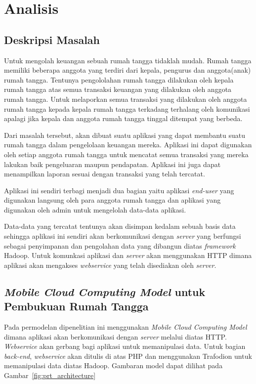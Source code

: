 \chapter{Analisis}
\label{chap:analisis}

\section{Deskripsi Masalah}
\label{sec:deskripsimasalah}

\hspace{0,5cm}Untuk mengolah keuangan sebuah rumah tangga tidaklah mudah. Rumah tangga memiliki beberapa anggota yang terdiri dari kepala, pengurus dan anggota(anak) rumah tangga. Tentunya pengololahan rumah tangga dilakukan oleh kepala rumah tangga atas semua transaksi keuangan yang dilakukan oleh anggota rumah tangga. Untuk melaporkan semua transaksi yang dilakukan oleh anggota rumah tangga kepada kepala rumah tangga terkadang terhalang oleh komunikasi apalagi jika kepala dan anggota rumah tangga tinggal ditempat yang berbeda.

Dari masalah tersebut, akan dibuat suatu aplikasi yang dapat membantu suatu rumah tangga dalam pengelolaan keuangan mereka. Aplikasi ini dapat digunakan oleh setiap anggota rumah tangga untuk mencatat semua transaksi yang mereka lakukan baik pengeluaran maupun pendapatan. Aplikasi ini juga dapat menampilkan laporan sesuai dengan transaksi yang telah tercatat.

Aplikasi ini sendiri terbagi menjadi dua bagian yaitu aplikasi \textit{end-user} yang digunakan langsung oleh para anggota rumah tangga dan aplikasi yang digunakan oleh admin untuk mengelolah data-data aplikasi.

Data-data yang tercatat tentunya akan disimpan kedalam sebuah basis data sehingga aplikasi ini sendiri akan berkomunikasi dengan \textit{server} yang berfungsi sebagai penyimpanan dan pengolahan data yang dibangun diatas \textit{framework} Hadoop. Untuk komunkasi aplikasi dan \textit{server} akan menggunakan HTTP dimana aplikasi akan mengakses \textit{webservice} yang telah disediakan oleh \textit{server}.

\section{\textit{Mobile Cloud Computing Model} untuk Pembukuan Rumah Tangga}

Pada permodelan dipenelitian ini menggunakan \textit{Mobile Cloud Computing Model} dimana aplikasi akan berkomunikasi dengan \textit{server} melalui  diatas HTTP. \textit{Webservice} akan gerbang bagi aplikasi untuk memanipulasi data. Untuk bagian \textit{back-end}, \textit{webservice} akan ditulis di atas PHP dan menggunakan Trafodion untuk memanipulasi data diatas Hadoop. Gambaran model dapat dilihat pada Gambar~\ref{fig:prt_architecture}

